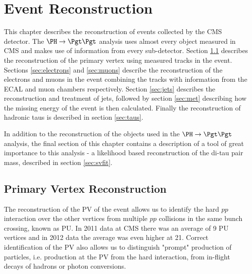 \chapter{Event Reconstruction}
\label{chap:reco}

This chapter describes the reconstruction of events collected by the CMS
detector. The $\PH \to \Pgt\Pgt$ analysis uses almost every object measured in
CMS and makes use of information from every sub-detector. 
Section \ref{sec:vertex} describes the reconstruction of the
primary vertex using measured tracks in the event. Sections \ref{sec:electrons}
and \ref{sec:muons} describe the reconstruction of the electrons and muons in
the event combining the tracks with information from the \ac{ECAL} and muon
chambers respectively. Section \ref{sec:jets} describes the reconstruction and
treatment of jets, followed by section \ref{sec:met} describing how the missing
energy of the event is then calculated. Finally the reconstruction of hadronic taus
is described in section \ref{sec:taus}.

In addition to the reconstruction of the objects used in the $\PH \to \Pgt\Pgt$
analysis, the final section of this chapter contains a description of a tool of
great importance to this analysis - a likelihood based reconstruction of the
di-tau pair mass, described in section \ref{sec:svfit}.

\section{Primary Vertex Reconstruction}
\label{sec:vertex}

The reconstruction of the \ac{PV} of the event allows us to identify the hard
$pp$ interaction over the other vertices from multiple $pp$ collisions in the same
bunch crossing, known as \ac{PU}. In 2011 data at CMS there was an average of 9
\ac{PU} vertices and in 2012 data the average was even higher at 21. Correct
identification of the \ac{PV} also allows us to distinguish "prompt" production of
particles, i.e. production at the \ac{PV} from the hard interaction, from
in-flight decays of hadrons or photon conversions.  

